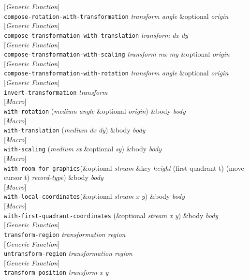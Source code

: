 \documentclass[10pt]{book}
\newenvironment{defother}[2]{[\textit{#1}]\\\texttt{#2}}{\\}
\newenvironment{defgeneric}[1]{\begin{defother}{Generic Function}{#1}}{\end{defother}}
\newenvironment{defmacro}[1]{\begin{defother}{Macro}{#1}}{\end{defother}}
\begin{document}
\begin{defgeneric}{compose-rotation-with-transformation} \textit{transform angle} \&optional \textit{origin}\end{defgeneric}
\begin{defgeneric}{compose-transformation-with-translation} \textit{transform dx dy}\end{defgeneric}
\begin{defgeneric}{compose-transformation-with-scaling} \textit{transform mx my} \&optional \textit{origin}\end{defgeneric}
\begin{defgeneric}{compose-transformation-with-rotation} \textit{transform angle} \&optional \textit{origin}\end{defgeneric}
\begin{defgeneric}{invert-transformation} \textit{transform}\end{defgeneric}
\begin{defmacro}{with-rotation} (\textit{medium angle} \&optional \textit{origin}) \&body \textit{body}\end{defmacro}
\begin{defmacro}{with-translation} (\textit{medium dx dy}) \&body \textit{body}\end{defmacro}
\begin{defmacro}{with-scaling} (\textit{medium sx} \&optional \textit{sy}) \&body \textit{body}\end{defmacro}
\begin{defmacro}{with-room-for-graphics}(\&optional \textit{stream} \&key \textit{height} (first-quadrant t) (move-cursor t) \textit{record-type}) \&body \textit{body}\end{defmacro}
\begin{defmacro}{with-local-coordinates}(\&optional \textit{stream x y}) \&body \textit{body}\end{defmacro}
\begin{defmacro}{with-first-quadrant-coordinates} (\&optional \textit{stream x y}) \&body \textit{body}\end{defmacro}
\begin{defgeneric}{transform-region}  \textit{transformation region}\end{defgeneric}
\begin{defgeneric}{untransform-region} \textit{transformation region}\end{defgeneric}
\begin{defgeneric}{transform-position} \textit{transform x y}\end{defgeneric}
\end{document}
